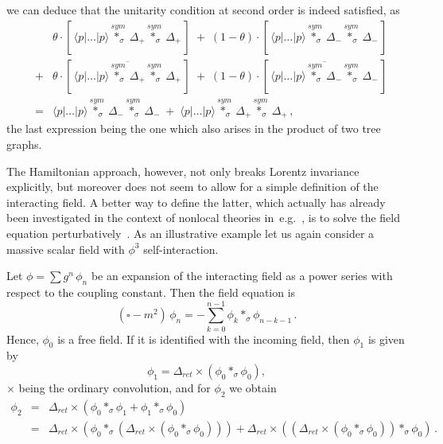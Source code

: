\documentclass[a4paper,twoside,12pt]{article}
\begin{document}
we can deduce that the unitarity condition at second order is indeed
satisfied, as 
\begin{eqnarray*} 
&&\theta\cdot[\,
\langle p|\dots |p\rangle
\stackrel{sym\;}{*_\sigma}\Delta_+
\stackrel{sym\;}{*_\sigma}\Delta_+\,]
\;+\;(1-\theta)\cdot[\,
\langle p|\dots|p\rangle
\stackrel{sym\;}{*_\sigma}\Delta_-
\stackrel{sym\;}{*_\sigma}\Delta_-\,]
\\
&+&\theta\cdot[\,
\overline{\langle p|\dots|p\rangle
\stackrel{sym\;}{*_\sigma}\Delta_+
\stackrel{sym\;}{*_\sigma}\Delta_+}\,]
\;+\;(1-\theta)\cdot[\,
\overline{\langle p|\dots |p\rangle
\stackrel{sym\;}{*_\sigma}\Delta_-
\stackrel{sym\;}{*_\sigma}\Delta_-}\,]
\\&=&
\langle p|\dots |p\rangle
\stackrel{sym\;}{*_\sigma}\Delta_-
\stackrel{sym\;}{*_\sigma}\Delta_-
\;+\;
\langle p|\dots |p\rangle
\stackrel{sym\;}{*_\sigma}\Delta_+
\stackrel{sym\;}{*_\sigma}\Delta_+\,,
\end{eqnarray*} 
the last expression being the one which also arises in the product of
two tree graphs.

The Hamiltonian approach, however, not only breaks Lorentz invariance
explicitly, but moreover does not seem to allow for  a simple definition of the
interacting field. A better way to define the latter, which actually has
already been investigated in the context of nonlocal theories
in~e.g.~\cite{kristensen,marnelius}, is to solve the field equation
perturbatively~\cite{yang}. As an illustrative example let us again consider a
massive scalar field with $\phi^3$ self-interaction.

Let $\phi=\sum g^n\,\phi_n$ be an expansion of the interacting field as a power
series with respect to the coupling constant. Then the field equation 
is 
$$
(\square-m^2)\, \phi_n = - \sum_{k=0}^{n-1}\phi_k*_{\sigma} \phi_{n-k-1}\,.
$$
Hence, $\phi_0$ is a free field. If it is identified with the incoming
field, then $\phi_1$ is given by 
$$
\phi_1=\Delta_{ret}\times (\phi_0*_{\sigma}\phi_0),
$$
$\times$ being the ordinary convolution, and for $\phi_2$ we obtain
\begin{eqnarray*}
\phi_2&=&\Delta_{ret}\times (\phi_0*_{\sigma}\phi_1+
\phi_1*_{\sigma}\phi_0)
\\&=&\Delta_{ret}\times (\phi_0*_{\sigma}(\Delta_{ret}\times 
(\phi_0*_{\sigma}\phi_0)))+
\Delta_{ret}\times((\Delta_{ret}\times 
(\phi_0*_{\sigma}\phi_0))*_{\sigma}\phi_0)\,.
\end{eqnarray*}
\end{document}
